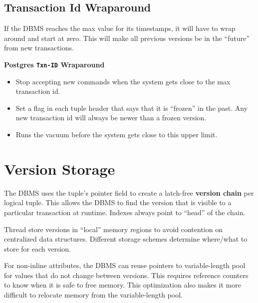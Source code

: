 \documentclass[11pt]{article}
\begin{document}
\subsection*{Transaction Id Wraparound}
If the DBMS reaches the max value for its timestamps, it will have to wrap around and start at zero. This will make all previous versions be in the ``future'' from new transactions.

\textbf{Postgres \texttt{Txn-ID} Wraparound}
\begin{itemize}
    \item
    Stop accepting new commands when the system gets close to the max transaction id.
        
    \item
    Set a flag in each tuple header that says that it is ``frozen'' in the past. Any new 
    transaction id will always be newer than a frozen version.
        
    \item
    Runs the vacuum before the system gets close to this upper limit.
\end{itemize}

\section{Version Storage}
The DBMS uses the tuple's pointer field to create a latch-free \textbf{version chain} per logical 
tuple. This allows the DBMS to find the version that is visible to a particular transaction at 
runtime. Indexes always point to ``head'' of the chain.

Thread store versions in ``local'' memory regions to avoid contention on centralized data 
structures. Different storage schemes determine where/what to store for each version.

For non-inline attributes, the DBMS can reuse pointers to variable-length pool for values that do 
not change between versions. This requires reference counters to know when it is safe to free 
memory. This optimization also makes it more difficult to relocate memory from the variable-length 
pool.
    
\end{document}

